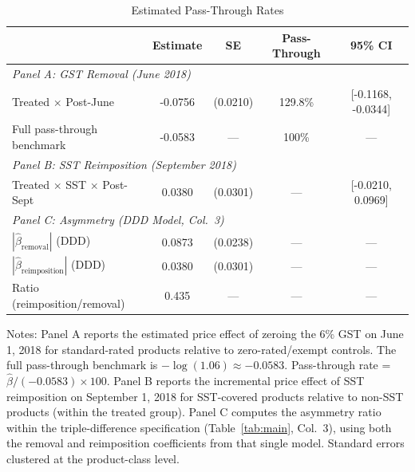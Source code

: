 \begin{table}[H]
\centering
\caption{Estimated Pass-Through Rates}
\label{tab:passthrough}
\begin{threeparttable}
\begin{tabular}{lcccc}
\toprule
 & Estimate & SE & Pass-Through & 95\% CI \\
\midrule
\multicolumn{5}{l}{\textit{Panel A: GST Removal (June 2018)}} \\
Treated $\times$ Post-June & -0.0756 & (0.0210) & 129.8\% & [-0.1168, -0.0344] \\
Full pass-through benchmark & -0.0583 & --- & 100\% & --- \\
\midrule
\multicolumn{5}{l}{\textit{Panel B: SST Reimposition (September 2018)}} \\
Treated $\times$ SST $\times$ Post-Sept & 0.0380 & (0.0301) & --- & [-0.0210, 0.0969] \\
\midrule
\multicolumn{5}{l}{\textit{Panel C: Asymmetry (DDD Model, Col.\ 3)}} \\
$|\hat{\beta}_{\text{removal}}|$ (DDD) & 0.0873 & (0.0238) & --- & --- \\
$|\hat{\beta}_{\text{reimposition}}|$ (DDD) & 0.0380 & (0.0301) & --- & --- \\
Ratio (reimposition/removal) & 0.435 & --- & --- & --- \\
\bottomrule
\end{tabular}
\begin{tablenotes}[flushleft]
\small
\item Notes: Panel A reports the estimated price effect of zeroing the 6\% GST on June 1, 2018 for standard-rated products relative to zero-rated/exempt controls. The full pass-through benchmark is $-\log(1.06) \approx -0.0583$. Pass-through rate = $\hat{\beta}/(-0.0583) \times 100$. Panel B reports the incremental price effect of SST reimposition on September 1, 2018 for SST-covered products relative to non-SST products (within the treated group). Panel C computes the asymmetry ratio within the triple-difference specification (Table~\ref{tab:main}, Col.\ 3), using both the removal and reimposition coefficients from that single model. Standard errors clustered at the product-class level.
\end{tablenotes}
\end{threeparttable}
\end{table}

